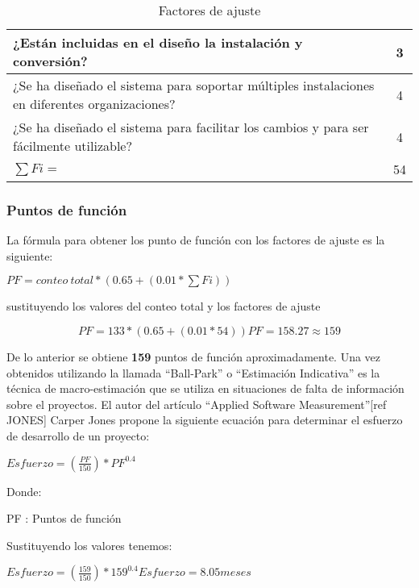 \begin{table}
\begin{tabular}{|p{9cm}|c|}
		¿Están incluidas en el diseño la instalación y conversión?                                                               & 3           \\ \hline
		¿Se ha diseñado el sistema para soportar múltiples instalaciones en diferentes organizaciones?                           & 4           \\ \hline
		¿Se ha diseñado el sistema para facilitar los cambios y para ser fácilmente utilizable?                                  & 4           \\ \hline
		\centering $\sum Fi=$                                                                                                  	 & 54          \\ \hline
		\end{tabular}
		\caption{Factores de ajuste}
		\label{tab:questions_adjusment}
		\end{table}


\subsubsection{Puntos de función}

La fórmula para obtener los punto de función con los factores de ajuste es la siguiente:


\begin{center}
	$
	PF = conteo\ total *  (0.65 + (0.01 * \sum Fi))
	$


	sustituyendo los valores del conteo total y los factores de ajuste


	\begin{equation}
		PF =  133 *  (0.65 + (0.01 * 54))
		PF = 158.27 \approx 159
	\end{equation}
\end{center}

De lo anterior se obtiene \textbf{159} puntos de función aproximadamente. Una vez obtenidos utilizando la llamada ``Ball-Park'' o ``Estimación Indicativa'' es la técnica de macro-estimación que se utiliza en situaciones de falta de información sobre el proyectos. El autor del artículo ``Applied Software Measurement''[ref JONES] Carper Jones propone la siguiente ecuación para determinar el esfuerzo de desarrollo de un proyecto:


\begin{center}
	$
	Esfuerzo = (\frac{PF}{150})*PF^{0.4}
	$


	Donde:


	PF : Puntos de función


	Sustituyendo los valores tenemos:

	$
	Esfuerzo = (\frac{159}{150})*159^{0.4}
	Esfuerzo = 8.05 meses
	$
\end{center}


